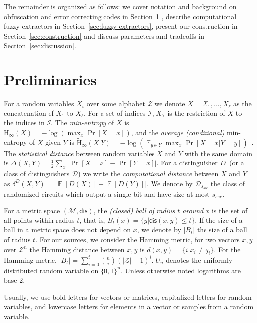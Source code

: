 \documentclass[11pt]{article}
\newcommand{\secref}[1]{\mbox{Section~\ref{#1}}}
\DeclareMathOperator*{\expe}{\mathbb{E}}
\newcommand{\dis}{\ensuremath{\mathsf{dis}}}
\newcommand{\Hoo}{\mathrm{H}_\infty}
\newcommand{\Hav}{\tilde{\mathrm{H}}_\infty}
\newcommand{\authnote}[2]{{\textcolor{red}{\textsf{#1 notes: }\textcolor{blue}{ #2}}\marginpar{\textcolor{red}{\textbf{!!!!!}}}}}
\newcommand{\authnote}[2]{}
\newcommand{\bnote}[1]{{\authnote{Ben}{#1}}}
\begin{document}
The remainder is organized as follows: we cover notation and background on obfuscation and error correcting codes in \secref{sec:preliminaries} , describe computational fuzzy extractors in \secref{sec:fuzzy extractors}, present our construction in \secref{sec:construction} and discuss parameters and tradeoffs in \secref{sec:discussion}.

\section{Preliminaries}
\label{sec:preliminaries}
For a random variables $X_i$ over some alphabet $\mathcal{Z}$ we denote $X = X_1,..., X_\ell$ as the concatenation of $X_1$ to $X_\ell$.  For a set of indices $\mathcal{I}$,  $X_{\mathcal{I}}$ is the restriction of $X$ to the indices in $\mathcal{I}$.  The {\em min-entropy} of $X$ is $\Hoo(X) = -\log(\max_x \Pr[X=x])$, 
and the {\em average (conditional)} min-entropy of $X$ given $Y$ is  $\Hav(X|Y) = -\log(\expe_{y\in Y} \max_{x} \Pr[X=x|Y=y])$~\cite[Section 2.4]{DBLP:journals/siamcomp/DodisORS08}.  
The {\em statistical distance} between random variables $X$ and $Y$ with the same domain is $\Delta(X,Y) = \frac12 \sum_x |\Pr[X=x] - \Pr[Y=x]|$. 
For a distinguisher $D$~(or a class of distinguishers $\mathcal{D}$) we write the \emph{computational distance} between $X$ and $Y$ as $\delta^D(X,Y) = \left| \expe[D(X)]-\expe[D(Y)]\right |$.  We denote by $\mathcal{D}_{s_{sec}}$ the class of randomized circuits which output a single bit and have size at most $s_{sec}$.

For a metric space $(\mathcal{M}, \dis)$, the \emph{(closed) ball of radius $t$ around $x$} is the set of all points within radius $t$, that is, $B_t(x) = \{y| \dis(x, y)\leq t\}$.  If the size of a ball in a metric space does not depend on $x$, we denote by $|B_t|$ the size of a ball of radius $t$.  For our sources, we consider the Hamming metric, for two vectors $x, y$ over $\mathcal{Z}^n$ the Hamming distance between $x,y$ is $d(x,y) = \{i | x_i \neq y_i\}$.  For the Hamming metric, $|B_t| = \sum_{i=0}^t {n \choose i} (|\mathcal{Z}|-1)^i $.  $U_n$ denotes the uniformly  distributed random variable on $\{0,1\}^n$.  Unless otherwise noted logarithms are base $2$.


Usually, we use bold letters for vectors or matrices, capitalized letters for random variables, and lowercase letters for elements in a vector or samples from a random variable. 
\end{document}
